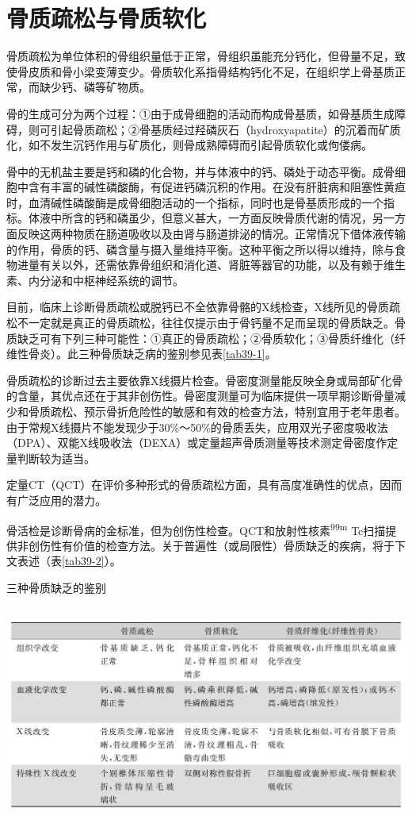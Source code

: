 \chapter{骨质疏松与骨质软化}

骨质疏松为单位体积的骨组织量低于正常，骨组织虽能充分钙化，但骨量不足，致使骨皮质和骨小梁变薄变少。骨质软化系指骨结构钙化不足，在组织学上骨基质正常，而缺少钙、磷等矿物质。

骨的生成可分为两个过程：①由于成骨细胞的活动而构成骨基质，如骨基质生成障碍，则可引起骨质疏松；②骨基质经过羟磷灰石（hydroxyapatite）的沉着而矿质化，如不发生沉钙作用与矿质化，则骨成熟障碍而引起骨质软化或佝偻病。

骨中的无机盐主要是钙和磷的化合物，并与体液中的钙、磷处于动态平衡。成骨细胞中含有丰富的碱性磷酸酶，有促进钙磷沉积的作用。在没有肝脏病和阻塞性黄疸时，血清碱性磷酸酶是成骨细胞活动的一个指标，同时也是骨基质形成的一个指标。体液中所含的钙和磷虽少，但意义甚大，一方面反映骨质代谢的情况，另一方面反映这两种物质在肠道吸收以及由肾与肠道排泌的情况。正常情况下借体液传输的作用，骨质的钙、磷含量与摄入量维持平衡。这种平衡之所以得以维持，除与食物进量有关以外，还需依靠骨组织和消化道、肾脏等器官的功能，以及有赖于维生素、内分泌和中枢神经系统的调节。

目前，临床上诊断骨质疏松或脱钙已不全依靠骨骼的X线检查，X线所见的骨质疏松不一定就是真正的骨质疏松，往往仅提示由于骨钙量不足而呈现的骨质缺乏。骨质缺乏可有下列三种可能性：①真正的骨质疏松；②骨质软化；③骨质纤维化（纤维性骨炎）。此三种骨质缺乏病的鉴别参见表\ref{tab39-1}。

骨质疏松的诊断过去主要依靠X线摄片检查。骨密度测量能反映全身或局部矿化骨的含量，其优点还在于其非创伤性。骨密度测量可为临床提供一项早期诊断骨量减少和骨质疏松、预示骨折危险性的敏感和有效的检查方法，特别宜用于老年患者。由于常规X线摄片不能发现少于30\%～50\%的骨质丢失，应用双光子密度吸收法（DPA）、双能X线吸收法（DEXA）或定量超声骨质测量等技术测定骨密度作定量判断较为适当。

定量CT（QCT）在评价多种形式的骨质疏松方面，具有高度准确性的优点，因而有广泛应用的潜力。

骨活检是诊断骨病的金标准，但为创伤性检查。QCT和放射性核素\textsuperscript{99m}
Tc扫描提供非创伤性有价值的检查方法。关于普遍性（或局限性）骨质缺乏的疾病，将于下文表述（表\ref{tab39-2}）。

\begin{table}[htbp]
\centering
\caption{三种骨质缺乏的鉴别}
\label{tab39-1}
\includegraphics[width=5.96875in,height=2.83333in]{./images/Image00244.jpg}
\end{table}

